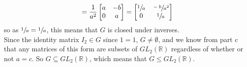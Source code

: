 \documentclass{article}
\newcommand{\R}{\mathbb{R}}
\begin{document}
\begin{enumerate}[label=\textbf{\alph*.}]
\[            = \dfrac{1}{a^2}\begin{bmatrix}
            a & -b \\
            0 & a \\
            \end{bmatrix}
            = \begin{bmatrix}
            \sfrac{1}{a} & \sfrac{-b}{a^2} \\
            0 & \sfrac{1}{a} \\
            \end{bmatrix} \]
            so as $\sfrac{1}{a} = \sfrac{1}{a}$,
            this means that $G$ is closed under inverses. \\
            Since the identity matrix $I_2 \in G$ since $1 = 1$,
            $G \neq \emptyset$,
            and we know from part c that any matrices of this form are
            subsets of $GL_2(\R)$ regardless of whether or not $a = c$.
            So $G \subseteq GL_2(\R)$,
            which means that $G \leqslant GL_2(\R)$.
    \end{enumerate}  
    
    
\end{document}
